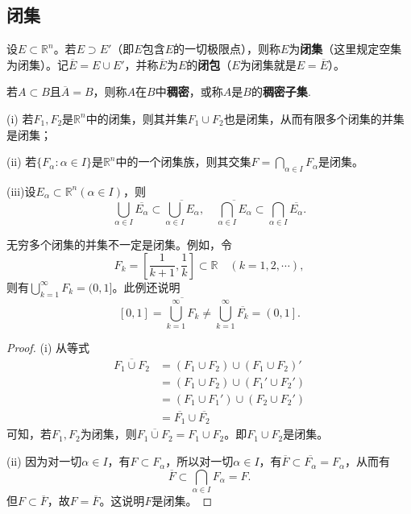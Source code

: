 \documentclass[lang=cn,newtx,10pt,scheme=chinese]{../Template/elegantbook}
\begin{document}
\subsection{闭集}

\begin{definition}[闭集与闭包]\label{definition:闭集与闭包}
设\(E\subset\mathbb{R}^n\)。若\(E\supset E'\)（即\(E\)包含\(E\)的一切极限点），则称\(E\)为\textbf{闭集}（这里规定空集为闭集）。记\(\overline{E}=E\cup E'\)，并称\(\overline{E}\)为\(E\)的\textbf{闭包}（\(E\)为闭集就是\(E = \overline{E}\)）。
\end{definition}

\begin{definition}[稠密子集]\label{definition:稠密子集}
  若\(A\subset B\)且\(\overline{A}=B\)，则称\(A\)在\(B\)中\textbf{稠密}，或称\(A\)是\(B\)的\textbf{稠密子集}.
\end{definition}

\begin{theorem}[闭集的运算性质]\label{theorem:闭集的运算性质}
  (i) 若\(F_1,F_2\)是\(\mathbb{R}^n\)中的闭集，则其并集\(F_1\cup F_2\)也是闭集，从而有限多个闭集的并集是闭集；

(ii) 若\(\{F_{\alpha}:\alpha\in I\}\)是\(\mathbb{R}^n\)中的一个闭集族，则其交集\(F = \bigcap_{\alpha\in I}F_{\alpha}\)是闭集。

(iii)设\(E_{\alpha}\subset\mathbb{R}^n(\alpha\in I)\)，则
\[\bigcup_{\alpha\in I}\overline{E_{\alpha}}\subset\overline{\bigcup_{\alpha\in I}E_{\alpha}},\quad\overline{\bigcap_{\alpha\in I}E_{\alpha}}\subset\bigcap_{\alpha\in I}\overline{E_{\alpha}}.\]
\end{theorem}
\begin{remark}
  无穷多个闭集的并集不一定是闭集。例如，令
\[F_k=\left[\frac{1}{k + 1},\frac{1}{k}\right]\subset\mathbb{R}\quad(k = 1,2,\cdots),\]
则有\(\bigcup_{k = 1}^{\infty}F_k=(0,1]\)。此例还说明
\[\left[ 0,1 \right] =\overline{\bigcup_{k=1}^{\infty}{F_k}}\ne \bigcup_{k=1}^{\infty}{\overline{F_k}}=\left( 0,1 \right] .\]
\end{remark}
\begin{proof}
  (i) 从等式
\begin{align*}
\overline{F_1\cup F_2}&=(F_1\cup F_2)\cup (F_1\cup F_2)'\\
&=(F_1\cup F_2)\cup (F_1'\cup F_2')\\
&=(F_1\cup F_1')\cup (F_2\cup F_2')\\
&=\overline{F_1}\cup\overline{F_2}
\end{align*}
可知，若\(F_1,F_2\)为闭集，则\(\overline{F_1\cup F_2}=F_1\cup F_2\)。即\(F_1\cup F_2\)是闭集。

(ii) 因为对一切\(\alpha\in I\)，有\(F\subset F_{\alpha}\)，所以对一切\(\alpha\in I\)，有\(\overline{F}\subset\overline{F_{\alpha}} = F_{\alpha}\)，从而有
\[\overline{F}\subset\bigcap_{\alpha\in I}F_{\alpha}=F.\]
但\(F\subset\overline{F}\)，故\(F=\overline{F}\)。这说明\(F\)是闭集。
\end{proof}
\end{document}
